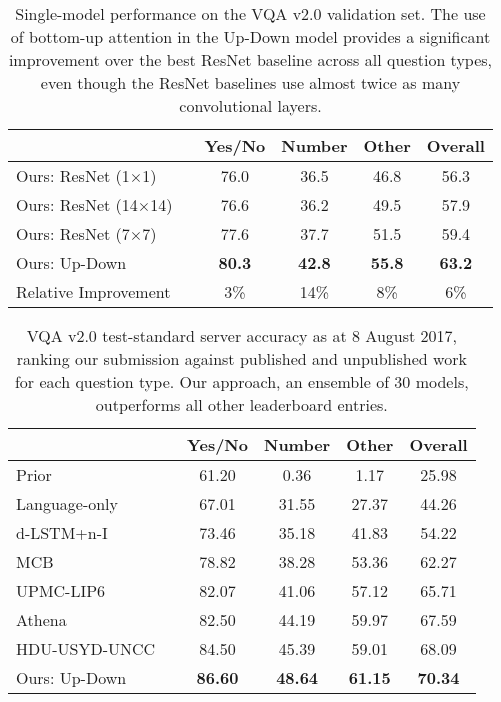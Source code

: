 \documentclass[10pt,twocolumn,letterpaper]{article}
\begin{document}
\begin{table}[t]
\small
\centering
\setlength{\tabcolsep}{.5em}
\begin{tabular}{llcccc}
\midrule
                                    &    &   Yes/No  &  Number   &  Other & Overall  \\
\midrule
Ours: ResNet (1$\times$1) &    			 & 76.0	& 36.5	& 46.8 & 56.3	\\
Ours: ResNet (14$\times$14) &   				 & 76.6	& 36.2	& 49.5	& 57.9 \\
Ours: ResNet (7$\times$7) &			 & 77.6	& 37.7	& 51.5 & 59.4	\\
Ours: Up-Down  &  & \textbf{80.3} & \textbf{42.8} & \textbf{55.8} & \textbf{63.2}\\
Relative Improvement &			 & 3\%	& 14\%	& 8\% & 6\%	\\
\midrule
\end{tabular}
\caption{Single-model performance on the VQA v2.0 validation set. The use of bottom-up attention in the Up-Down model provides a significant improvement over the best ResNet baseline across all question types, even though the ResNet baselines use almost twice as many convolutional layers.}
\label{tab:vqa_val}
\end{table}


\begin{table}[t]
\small
\centering
\setlength{\tabcolsep}{.5em}
\begin{tabular}{llcccc}
\midrule
                                    &    &   Yes/No  &  Number   &  Other & Overall  \\
\midrule
Prior~\cite{balanced_vqa_v2} &						 & 61.20	& 0.36	& 1.17	& 25.98\\
Language-only~\cite{balanced_vqa_v2} &									 & 67.01	& 31.55	& 27.37	& 44.26\\
d-LSTM+n-I~\cite{lu2015deeperLstm,balanced_vqa_v2} &		 & 73.46	& 35.18	& 41.83 & 54.22	\\
MCB~\cite{fukui2016multimodal,balanced_vqa_v2} &					 & 78.82	& 38.28	& 53.36	& 62.27\\
UPMC-LIP6 &    			 & 82.07	& 41.06	& 57.12 & 65.71	\\
Athena &   				 & 82.50	& 44.19	& 59.97	& 67.59 \\
HDU-USYD-UNCC &			 & 84.50	& 45.39	& 59.01 & 68.09	\\
Ours: Up-Down  &  & \textbf{86.60} & \textbf{48.64} & \textbf{61.15} & \textbf{70.34}\\
\midrule
\end{tabular}
\caption{VQA v2.0 test-standard server accuracy as at 8 August 2017, ranking our submission against published and unpublished work for each question type. Our approach, an ensemble of 30 models, outperforms all other leaderboard entries.}
\label{tab:vqa_test}
\end{table}
\end{document}
